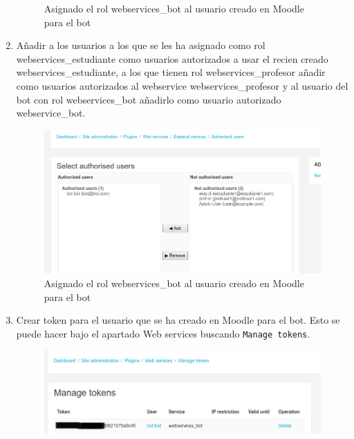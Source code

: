 \begin{enumerate}
\begin{figure}[H]
\caption{Asignado el rol webservices\_bot al usuario creado en Moodle para el bot }\label{figura418}
\end{figure}

\item Añadir a los usuarios a los que se les ha asignado como rol webservices\_estudiante como usuarios autorizados a usar el recien creado webservices\_estudiante, a los que tienen rol webservices\_profesor añadir como usuarios autorizados al webservice webservices\_profesor y al usuario del bot con rol webservices\_bot añadirlo como usuario autorizado webservice\_bot. 

\begin{figure}[H] %
\centering
\includegraphics[scale=0.3]{imagenes/moodle/Screenshot_2017-08-25_11-48-23}  %

\caption{Asignado el rol webservices\_bot al usuario creado en Moodle para el bot }\label{figura419}
\end{figure}

\item Crear token para el usuario que se ha creado en Moodle para el bot. Esto se puede hacer bajo el apartado Web services buscando \texttt{Manage tokens}.



\begin{figure}[H] %
\centering
\includegraphics[scale=0.3]{imagenes/moodle/Screenshot_2017-08-25_11-59-03.png}  %


\end{figure}
\end{enumerate}
